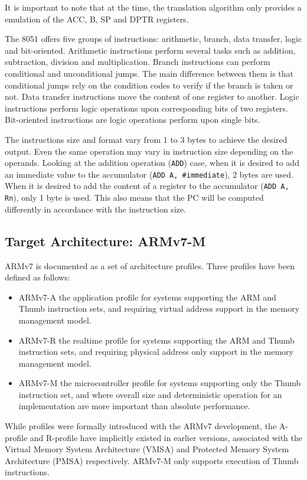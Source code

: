 \documentclass[11pt]{report}
\begin{document}
		\par It is important to note that at the time, the translation algorithm only provides a emulation of the ACC, B, SP and DPTR registers.
		\par The 8051 offers five groups of instructions: arithmetic, branch, data transfer, logic and bit-oriented. Arithmetic instructions perform several tasks such as addition, subtraction, division and multiplication. Branch instructions can perform conditional and unconditional jumps. The main difference between them is that conditional jumps rely on the condition codes to verify if the branch is taken or not. Data transfer instructions move the content of one register to another. Logic instructions perform logic operations upon corresponding bits of two registers. Bit-oriented instructions are logic operations perform upon single bits\cite{mikroelektronika}.
		\par The instructions size and format vary from 1 to 3 bytes to achieve the desired output. Even the same operation may vary in instruction size depending on the operands. Looking at the addition operation (\texttt{ADD}) case, when it is desired to add an immediate value to the accumulator (\texttt{ADD A, \#immediate}), 2 bytes are used. When it is desired to add the content of a register to the accumulator (\texttt{ADD A, Rn}), only 1 byte is used. This also means that the PC will be computed differently in accordance with the instruction size.
		
		\subsection{Target Architecture: ARMv7-M \cite{armv7-m}}
		
		\par ARMv7 is documented as a set of architecture profiles. Three profiles have been defined as follows:
		\begin{itemize}
			\item ARMv7-A the application profile for systems supporting the ARM and Thumb instruction sets, and
			requiring virtual address support in the memory management model.
			\item ARMv7-R the realtime profile for systems supporting the ARM and Thumb instruction sets, and requiring physical address only support in the memory management model.
			\item ARMv7-M the microcontroller profile for systems supporting only the Thumb instruction set, and where overall size and deterministic operation for an implementation are more important than absolute performance.
		\end{itemize}
		\par While profiles were formally introduced with the ARMv7 development, the A-profile and R-profile have implicitly existed in earlier versions, associated with the Virtual Memory System Architecture (VMSA) and Protected Memory System Architecture (PMSA) respectively. ARMv7-M only supports execution of Thumb instructions.
		
\end{document}
